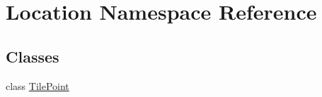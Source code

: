 \hypertarget{namespaceLocation}{}\section{Location Namespace Reference}
\label{namespaceLocation}
\subsection*{Classes}
\begin{DoxyCompactItemize}
\item 
class \hyperlink{classLocation_1_1TilePoint}{Tile\+Point}
\end{DoxyCompactItemize}
